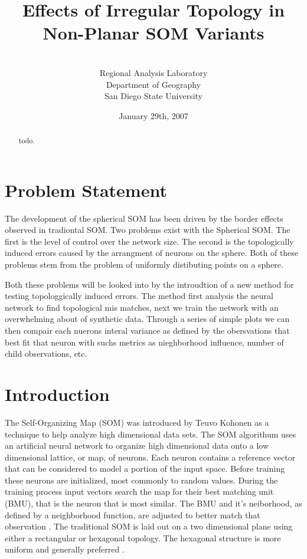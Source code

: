 \documentclass[12pt]{article}
\title{Effects of Irregular Topology in Non-Planar SOM Variants}
\author{\sc{Charles R. Schmidt}\\Regional Analysis Laboratory\\Department of Geography\\San Diego State University}
\date{January 29th, 2007}
\begin{document}
\maketitle
\begin{abstract}
todo.
\end{abstract}

\section{Problem Statement}
The development of the spherical SOM has been driven by the border effects
observed in tradiontal SOM.  Two problems exist with the Spherical SOM. The
first is the level of control over the network size. The second is the
topologically induced errors caused by the arrangment of neurons on the sphere.
Both of these problems stem from the problem of uniformly distibuting points on
a sphere.

Both these problems will be looked into by the introudtion of a new method for
testing topologgically induced errors. The method first analysis the neural
network to find topological mis matches, next we train the network with an
overwhelming about of synthetic data.  Through a series of simple plots we can
then compair each nuerons interal variance as defined by the obersvations that
best fit that neuron with suchs metrics as nieghborhood influence, number of
child observations, etc.

\section{Introduction}
The Self-Organizing Map (SOM) was introduced by Teuvo Kohonen as a technique to
help analyze high dimensional data sets. The SOM algorithum uses an artificial
neural network to organize high dimensional data onto a low dimensional lattice,
or map, of neurons.  Each neuron contains a reference vector that can be
considered to model a portion of the input space. Before training these neurons
are initialized, most commonly to random values.  During the training process
input vectors search the map for their best matching unit (BMU), that is the
neuron that is most similar. The BMU and it's neiborhood, as defined by a
neighborhood function, are adjusted to better match that observation
\citep{Kohonen2000}.  The traditional SOM is laid out on a two dimensional plane
using either a rectangular or hexagonal topology.  The hexagonal structure is
more uniform and generally preferred \citep{Wu:2006lr}.
\end{document}
